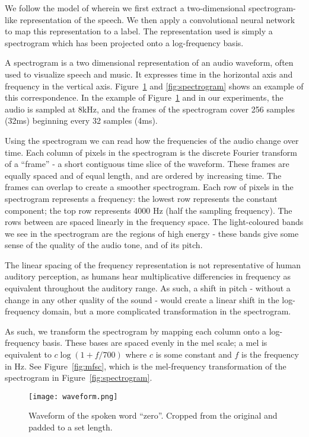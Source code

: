 We follow the model of \cite{abdel2014convolutional} wherein we first extract a two-dimensional spectrogram-like representation of the speech. We then apply a convolutional neural network to map this representation to a label. The representation used is simply a spectrogram which has been projected onto a log-frequency basis.

A spectrogram is a two dimensional representation of an audio waveform, often used to visualize speech and music. It expresses time in the horizontal axis and frequency in the vertical axis. Figure~\ref{fig:waveform} and \ref{fig:spectrogram} shows an example of this correspondence. In the example of Figure~\ref{fig:waveform} and in our experiments, the audio is sampled at 8kHz, and the frames of the spectrogram cover 256 samples (32ms) beginning every 32 samples (4ms).

Using the spectrogram we can read how the frequencies of the audio change over time. Each column of pixels in the spectrogram is the discrete Fourier transform of a ``frame'' - a short contiguous time slice of the waveform. These frames are equally spaced and of equal length, and are ordered by increasing time. The frames can overlap to create a smoother spectrogram. Each row of pixels in the spectrogram represents a frequency: the lowest row represents the constant component; the top row represents 4000 Hz (half the sampling frequency). The rows between are spaced linearly in the frequency space. The light-coloured bands we see in the spectrogram are the regions of high energy - these bands give some sense of the quality of the audio tone, and of its pitch.

The linear spacing of the frequency representation is not representative of human auditory perception, as humans hear multiplicative differencies in frequency as equivalent throughout the auditory range. As such, a shift in pitch - without a change in any other quality of the sound - would create a linear shift in the log-frequency domain, but a more complicated transformation in the spectrogram.

As such, we transform the spectrogram by mapping each column onto a log-frequency basis. These bases are spaced evenly in the mel scale; a mel is equivalent to $c \log(1 + f / 700)$ where $c$ is some constant and $f$ is the frequency in Hz. See Figure~\ref{fig:mfsc}, which is the mel-frequency transformation of the spectrogram in Figure~\ref{fig:spectrogram}.


\begin{figure}
\centering
\texttt{[image: waveform.png]}
\caption{Waveform of the spoken word ``zero''. Cropped from the original and padded to a set length.}
\label{fig:waveform}
\end{figure}


